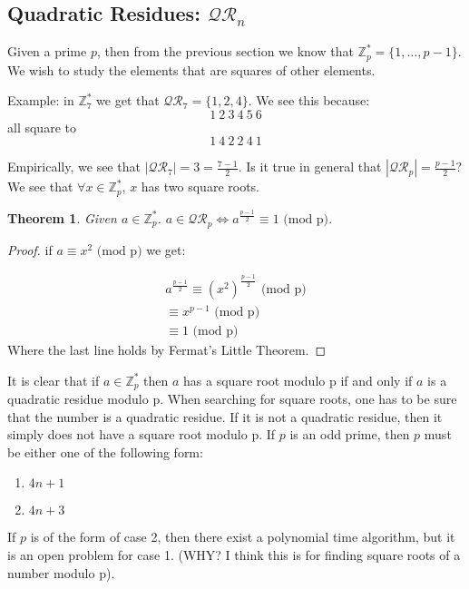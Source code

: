 \documentclass[12pt,a4paper]{article}
\newtheorem{thm}{Theorem}
\begin{document}
\subsection{Quadratic Residues: $\mathcal{QR}_{n}$}
Given a prime $p$, then from the previous section we know that $\mathbb{Z}_{p}^{\ast} = \{1, \ldots, p-1 \}$. We wish to study the elements that are squares of other elements. 

Example: in $\mathbb{Z}_{7}^{\ast}$ we get that $\mathcal{QR}_{7} = \{1, 2, 4\}$. We see this because: 
\[
	1 \  2 \  3 \  4 \  5 \  6 
\]
all square to 
\[
	1 \ 4 \ 2 \ 2 \ 4 \ 1
\]

Empirically, we see that $|\mathcal{QR}_{7}| = 3 = \frac{7 - 1}{2}$. Is it true in general that $|\mathcal{QR}_{p}| = \frac{p-1}{2}$? We see that $\forall x \in \mathbb{Z}_{p}^{\ast}$, $x$ has two square roots. 

\begin{thm} 
Given $a\in\mathbb{Z}_{p}^{\ast}$. $a \in \mathcal{QR}_{p} \iff a^{\frac{p-1}{2}} \equiv 1 \text{ (mod p)}$. 
\end{thm}

\begin{proof}
if $a \equiv x^{2} \text{ (mod p)}$ we get: 

\begin{align*}
	a^{\frac{p-1}{2}} \equiv (x^2)^{\frac{p-1}{2}} \text{ (mod p)} \\
	 \equiv x^{p-1} \text{ (mod p)} \\
	 \equiv 1 \text{ (mod p)}
\end{align*}
Where the last line holds by Fermat's Little Theorem. 
\end{proof}
It is clear that if $a \in \mathbb{Z}_{p}^{\ast}$ then $a$ has a square root modulo p if and only if $a$ is a quadratic residue modulo p. When searching for square roots, one has to be sure that the number is a quadratic residue. If it is not a quadratic residue, then it simply does not have a square root modulo p. 
If $p$ is an odd prime, then $p$ must be either one of the following form: 

\begin{enumerate}
	\item $4n + 1$
	\item $4n + 3$
\end{enumerate}

If $p$ is of the form of case 2, then there exist a polynomial time algorithm, but it is an open problem for case 1. (WHY? I think this is for finding square roots of a number modulo p). 
\end{document}
